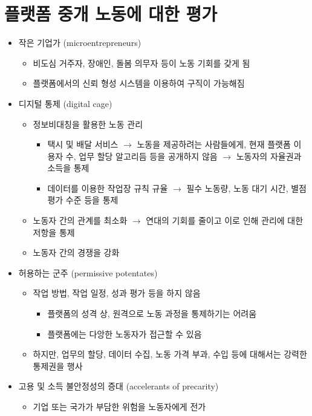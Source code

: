 \section{플랫폼 중개 노동에 대한 평가}
\begin{itemize}
\item 작은 기업가 (microentrepreneurs) \citep{Sundararajan:2016aa}
	\begin{itemize}
	\item 비도심 거주자, 장애인, 돌봄 의무자 등이 노동 기회를 갖게 됨
	\item 플랫폼에서의 신뢰 형성 시스템을 이용하여 구직이 가능해짐
	\end{itemize}
\item 디지털 통제 (digital cage)
	\begin{itemize}
	\item 정보비대칭을 활용한 노동 관리
		\begin{itemize}
		\item 택시 및 배달 서비스 $\rightarrow$ 노동을 제공하려는 사람들에게, 현재 플랫폼 이용자 수, 업무 할당 알고리듬 등을 공개하지 않음 $\rightarrow$ 노동자의 자율권과 소득을 통제
		\item 데이터를 이용한 작업장 규칙 규율 $\rightarrow$ 필수 노동량, 노동 대기 시간, 별점 평가 수준 등을 통제
		\end{itemize}
	\item 노동자 간의 관계를 최소화 $\rightarrow$ 연대의 기회를 줄이고 이로 인해 관리에 대한 저항을 통제
	\item 노동자 간의 경쟁을 강화
	\end{itemize}
\item 허용하는 군주 (permissive potentates)
	\begin{itemize}
	\item 작업 방법, 작업 일정, 성과 평가 등을 하지 않음
		\begin{itemize}
		\item 플랫폼의 성격 상, 원격으로 노동 과정을 통제하기는 어려움
		\item 플랫폼에는 다앙한 노동자가 접근할 수 있음
		\end{itemize}
	\item 하지만, 업무의 할당, 데이터 수집, 노동 가격 부과, 수입 등에 대해서는 강력한 통제권을 행사
	\end{itemize}	
\item 고용 및 소득 불안정성의 증대 (accelerants of precarity)
	\begin{itemize}
	\item 기업 또는 국가가 부담한 위험을 노동자에게 전가

\end{itemize}
\end{itemize}
